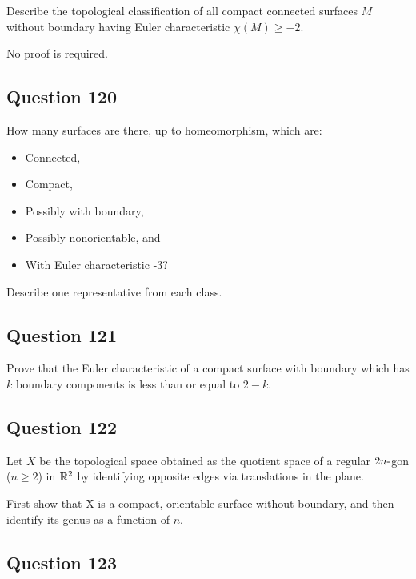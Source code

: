 \documentclass[12pt]{article}
\providecommand{\tightlist}{%
  \setlength{\itemsep}{0pt}\setlength{\parskip}{0pt}}
\begin{document}
Describe the topological classification of all compact connected
surfaces \(M\) without boundary having Euler characteristic
\(\chi(M )\geq -2\).

No proof is required.

\hypertarget{question-120-2}{%
\subsection{Question 120}\label{question-120-2}}

How many surfaces are there, up to homeomorphism, which are:

\begin{itemize}
\tightlist
\item
  Connected,
\item
  Compact,
\item
  Possibly with boundary,
\item
  Possibly nonorientable, and
\item
  With Euler characteristic -3?
\end{itemize}

Describe one representative from each class.

\hypertarget{question-121-2}{%
\subsection{Question 121}\label{question-121-2}}

Prove that the Euler characteristic of a compact surface with boundary
which has \(k\) boundary components is less than or equal to \(2 - k\).

\hypertarget{question-122-2}{%
\subsection{Question 122}\label{question-122-2}}

Let \(X\) be the topological space obtained as the quotient space of a
regular \(2n{\hbox{-}}\)gon (\(n \geq 2\)) in \({\mathbb{R}}^2\) by identifying
opposite edges via translations in the plane.

First show that X is a compact, orientable surface without boundary, and
then identify its genus as a function of \(n\).

\hypertarget{question-123-2}{%
\subsection{Question 123}\label{question-123-2}}
\end{document}
